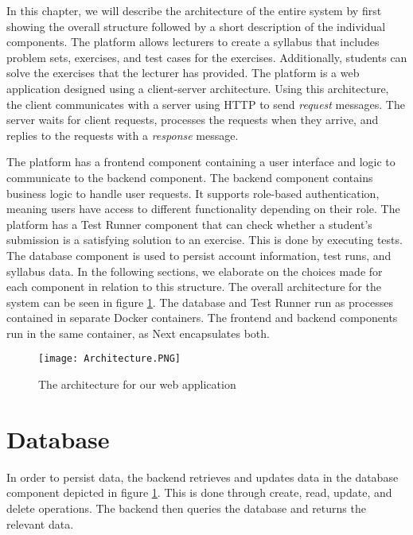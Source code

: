 In this chapter, we will describe the architecture of the entire system by first showing the overall structure followed by a short description of the individual components.
The platform allows lecturers to create a syllabus that includes problem sets, exercises, and test cases for the exercises. Additionally, students can solve the exercises that the lecturer has provided.
The platform is a web application designed using a client-server architecture. Using this architecture, the client communicates with a server using HTTP to send \textit{request} messages. The server waits for client requests, processes the requests when they arrive, and replies to the requests with a \textit{response} message.

The platform has a frontend component containing a user interface and logic to communicate to the backend component.
The backend component contains business logic to handle user requests.
It supports role-based authentication, meaning users have access to different functionality depending on their role.
The platform has a Test Runner component that can check whether a student's submission is a satisfying solution to an exercise.
This is done by executing tests. The database component is used to persist account information, test runs, and syllabus data.
In the following sections, we elaborate on the choices made for each component in relation to this structure.
The overall architecture for the system can be seen in figure \ref{fig:Architecture}.
The database and Test Runner run as processes contained in separate Docker containers. The frontend and backend components run in the same container, as Next encapsulates both.

\begin{figure}[H]
	\texttt{[image: Architecture.PNG]}
	\centering
	\caption{The architecture for our web application}
	\label{fig:Architecture}
\end{figure}


\section{Database}
In order to persist data, the backend retrieves and updates data in the database component depicted in figure \ref{fig:Architecture}. This is done through create, read, update, and delete operations.
The backend then queries the database and returns the relevant data.

